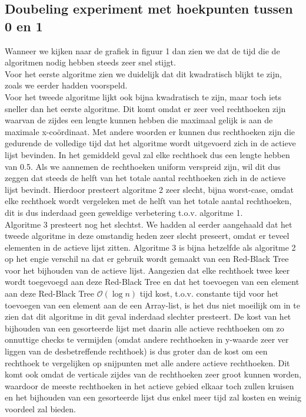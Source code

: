 \documentclass[11pt,a4paper,titlepage]{article}
\begin{document}
		\subsection{Doubeling experiment met hoekpunten tussen 0 en 1}
			Wanneer we kijken naar de grafiek in figuur 1 dan zien we dat de tijd die de algoritmen nodig hebben steeds zeer snel stijgt. \\
			Voor het eerste algoritme zien we duidelijk dat dit kwadratisch blijkt te zijn, zoals we eerder hadden voorspeld.\\
			Voor het tweede algoritme lijkt ook bijna kwadratisch te zijn, maar toch iets sneller dan het eerste algoritme.  Dit komt omdat er zeer veel rechthoeken zijn waarvan de zijdes een lengte kunnen hebben die maximaal gelijk is aan de maximale x-coördinaat.  Met andere woorden er kunnen dus rechthoeken zijn die gedurende de volledige tijd dat het algoritme wordt uitgevoerd zich in de actieve lijst bevinden.  In het gemiddeld geval zal elke rechthoek dus een lengte hebben van 0.5.  Als we aannemen de rechthoeken uniform verspreid zijn, wil dit dus zeggen dat steeds de helft van het totale aantal rechthoeken zich in de actieve lijst bevindt. Hierdoor presteert algoritme 2 zeer slecht, bijna worst-case, omdat elke rechthoek wordt vergeleken met de helft van het totale aantal rechthoeken, dit is dus inderdaad geen geweldige verbetering t.o.v. algoritme 1.\\
			Algoritme 3 presteert nog het slechtst.  We hadden al eerder aangehaald dat het tweede algoritme in deze omstandig heden zeer slecht preseert, omdat er teveel elementen in de actieve lijst zitten. Algoritme 3 is bijna hetzelfde als algoritme 2  op het engie verschil na dat er gebruik wordt gemaakt van een Red-Black Tree voor het bijhouden van de actieve lijst.  Aangezien dat elke rechthoek twee keer wordt toegevoegd aan deze Red-Black Tree en dat het toevoegen van een element aan deze Red-Black Tree $\mathcal{O}(\log n)$ tijd kost, t.o.v. constante tijd voor het toevoegen van een element aan de een Array-list, is het dus niet moeilijk om in te zien dat dit algoritme in dit geval inderdaad slechter presteert. De kost van het bijhouden van een gesorteerde lijst met daarin alle actieve rechthoeken om zo onnuttige checks te vermijden (omdat andere rechthoeken in y-waarde zeer ver liggen van de desbetreffende rechthoek) is dus groter dan de kost om een rechthoek te vergelijken op snijpunten met alle andere actieve rechthoeken. Dit komt ook omdat de verticale zijdes van de rechthoeken zeer groot kunnen worden, waardoor de meeste rechthoeken in het actieve gebied elkaar toch zullen kruisen en het bijhouden van een gesorteerde lijst dus enkel meer tijd zal kosten en weinig voordeel zal bieden.
\end{document}

